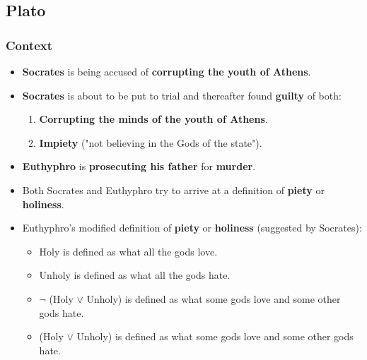 \documentclass[11pt]{article}
\begin{document}
\subsection{Plato}
\label{sec:org47aecdc}

\subsubsection{Context}
\label{sec:org5d7691b}
\begin{itemize}
\item \textbf{Socrates} is being accused of \textbf{corrupting the youth of Athens}.
\item \textbf{Socrates} is about to be put to trial and thereafter found \textbf{guilty} of both:
\begin{enumerate}
\item \textbf{Corrupting the minds of the youth of Athens}.
\item \textbf{Impiety} ("not believing in the Gods of the state").
\end{enumerate}
\item \textbf{Euthyphro} is \textbf{prosecuting his father} for \textbf{murder}.
\item Both Socrates and Euthyphro try to arrive at a definition of \textbf{piety} or \textbf{holiness}.
\item Euthyphro's modified definition of \textbf{piety} or \textbf{holiness} (suggested by Socrates):
\begin{itemize}
\item Holy is defined as what all the gods love.
\item Unholy is defined as what all the gods hate.
\item \(\neg\) (Holy \(\vee\) Unholy) is defined as what some gods love and some other gods hate.
\item (Holy \(\vee\) Unholy) is defined as what some gods love and some other gods hate.
\end{itemize}
\end{itemize}
\end{document}
